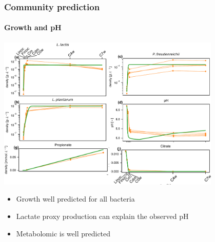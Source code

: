 \documentclass[8pt,usenames,dvipsnames]{beamer}
\begin{document}
\begin{frame}
\frametitle{Community prediction}
\framesubtitle{Growth and pH}
\centering
\includegraphics[width=0.8\textwidth]{figures/community-pred-growth.pdf}
\begin{block}{}
\begin{itemize}
\item Growth well predicted for all bacteria
\item Lactate proxy production can explain the observed pH
\item Metabolomic is well predicted 
\end{itemize}
\end{block}
\end{frame}
%
%
%
\end{document}
